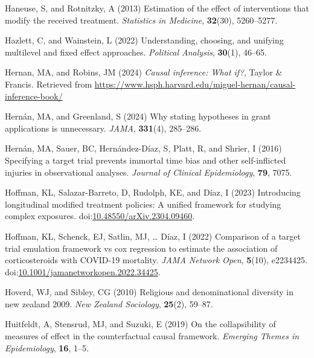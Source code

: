 \documentclass[
  single column]{article}
\newlength{\cslhangindent}
\newenvironment{CSLReferences}[2] %
 {\begin{list}{}{%
  \setlength{\itemindent}{0pt}
  \setlength{\leftmargin}{0pt}
  \setlength{\parsep}{0pt}
  \ifodd #1
   \setlength{\leftmargin}{\cslhangindent}
   \setlength{\itemindent}{-1\cslhangindent}
  \fi
  \setlength{\itemsep}{#2\baselineskip}}}
 {\end{list}}
\begin{document}
\begin{CSLReferences}{1}{0}
Haneuse, S, and Rotnitzky, A (2013) Estimation of the effect of
interventions that modify the received treatment. \emph{Statistics in
Medicine}, \textbf{32}(30), 5260--5277.

Hazlett, C, and Wainstein, L (2022) Understanding, choosing, and
unifying multilevel and fixed effect approaches. \emph{Political
Analysis}, \textbf{30}(1), 46--65.

Hernan, MA, and Robins, JM (2024) \emph{Causal inference: What if?},
Taylor \& Francis. Retrieved from
\url{https://www.hsph.harvard.edu/miguel-hernan/causal-inference-book/}

Hernán, MA, and Greenland, S (2024) Why stating hypotheses in grant
applications is unnecessary. \emph{JAMA}, \textbf{331}(4), 285--286.

Hernán, MA, Sauer, BC, Hernández-Díaz, S, Platt, R, and Shrier, I (2016)
Specifying a target trial prevents immortal time bias and other
self-inflicted injuries in observational analyses. \emph{Journal of
Clinical Epidemiology}, \textbf{79}, 7075.

Hoffman, KL, Salazar-Barreto, D, Rudolph, KE, and Díaz, I (2023)
Introducing longitudinal modified treatment policies: A unified
framework for studying complex exposures.
doi:\href{https://doi.org/10.48550/arXiv.2304.09460}{10.48550/arXiv.2304.09460}.

Hoffman, KL, Schenck, EJ, Satlin, MJ, \ldots{} Díaz, I (2022) Comparison
of a target trial emulation framework vs cox regression to estimate the
association of corticosteroids with COVID-19 mortality. \emph{JAMA
Network Open}, \textbf{5}(10), e2234425.
doi:\href{https://doi.org/10.1001/jamanetworkopen.2022.34425}{10.1001/jamanetworkopen.2022.34425}.

Hoverd, WJ, and Sibley, CG (2010) Religious and denominational diversity
in new zealand 2009. \emph{New Zealand Sociology}, \textbf{25}(2),
59--87.

Huitfeldt, A, Stensrud, MJ, and Suzuki, E (2019) On the collapsibility
of measures of effect in the counterfactual causal framework.
\emph{Emerging Themes in Epidemiology}, \textbf{16}, 1--5.


\end{CSLReferences}
\end{document}
